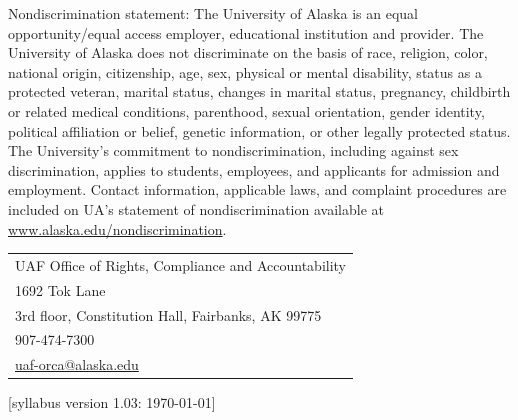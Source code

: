 \documentclass[12pt]{article}
\begin{document}
Nondiscrimination statement: The University of Alaska is an equal opportunity/equal access employer, educational institution and provider. The University of Alaska does not discriminate on the basis of race, religion, color, national origin, citizenship, age, sex, physical or mental disability, status as a protected veteran, marital status, changes in marital status, pregnancy, childbirth or related medical conditions, parenthood, sexual orientation, gender identity, political affiliation or belief, genetic information, or other legally protected status. The University's commitment to nondiscrimination, including against sex discrimination, applies to students, employees, and applicants for admission and employment. Contact information, applicable laws, and complaint procedures are included on UA's statement of nondiscrimination available at \url{www.alaska.edu/nondiscrimination}.

\begin{tabular}{l}
UAF Office of Rights, Compliance and Accountability\\
1692 Tok Lane\\
3rd floor, Constitution Hall, Fairbanks, AK 99775\\
907-474-7300\\
\url{uaf-orca@alaska.edu}
\end{tabular}

\hfill  \scriptsize [syllabus version 1.03: \today] \normalsize
\end{document}
